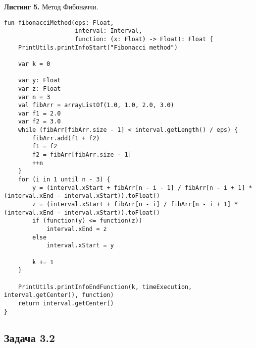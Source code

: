 \documentclass[a4paper, 12pt]{article}   	%
\begin{document}
    \textbf{Листинг 5.} Метод Фибоначчи.
    \begin{verbatim}
fun fibonacciMethod(eps: Float,
                    interval: Interval,
                    function: (x: Float) -> Float): Float {
    PrintUtils.printInfoStart("Fibonacci method")

    var k = 0

    var y: Float
    var z: Float
    var n = 3
    val fibArr = arrayListOf(1.0, 1.0, 2.0, 3.0)
    var f1 = 2.0
    var f2 = 3.0
    while (fibArr[fibArr.size - 1] < interval.getLength() / eps) {
        fibArr.add(f1 + f2)
        f1 = f2
        f2 = fibArr[fibArr.size - 1]
        ++n
    }
    for (i in 1 until n - 3) {
        y = (interval.xStart + fibArr[n - i - 1] / fibArr[n - i + 1] * (interval.xEnd - interval.xStart)).toFloat()
        z = (interval.xStart + fibArr[n - i] / fibArr[n - i + 1] * (interval.xEnd - interval.xStart)).toFloat()
        if (function(y) <= function(z))
            interval.xEnd = z
        else
            interval.xStart = y

        k += 1
    }

    PrintUtils.printInfoEndFunction(k, timeExecution, interval.getCenter(), function)
    return interval.getCenter()
}
    \end{verbatim}
    
\subsection{Задача 3.2}
\end{document}
